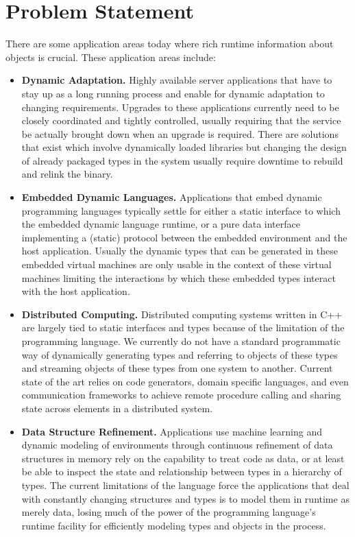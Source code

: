 \section{Problem Statement}

There are some application areas today where rich runtime information about
objects is crucial.  These application areas include:

\begin{itemize}

  \item \textbf{Dynamic Adaptation.} Highly available server applications that
  have to stay up as a long running process and enable for dynamic adaptation
  to changing requirements. Upgrades to these applications currently need to
  be closely coordinated and tightly controlled, usually requiring that the
  service be actually brought down when an upgrade is required. There are
  solutions that exist which involve dynamically loaded libraries but changing
  the design of already packaged types in the system usually require downtime
  to rebuild and relink the binary.

  \item \textbf{Embedded Dynamic Languages.} Applications that embed dynamic
  programming languages typically settle for either a static interface to
  which the embedded dynamic language runtime, or a pure data interface
  implementing a (static) protocol between the embedded environment and the
  host application. Usually the dynamic types that can be generated in these
  embedded virtual machines are only usable in the context of these virtual
  machines limiting the interactions by which these embedded types interact
  with the host application.

  \item \textbf{Distributed Computing.} Distributed computing systems written
  in C++ are largely tied to static interfaces and types because of the
  limitation of the programming language. We currently do not have a standard
  programmatic way of dynamically generating types and referring to objects of
  these types and streaming objects of these types from one system to another.
  Current state of the art relies on code generators, domain specific
  languages, and even communication frameworks to achieve remote procedure
  calling and sharing state across elements in a distributed system.

  \item \textbf{Data Structure Refinement.} Applications use machine learning
  and dynamic modeling of environments through continuous refinement of data
  structures in memory rely on the capability to treat code as data, or at
  least be able to inspect the state and relationship between types in a
  hierarchy of types. The current limitations of the language force the
  applications that deal with constantly changing structures and types is to
  model them in runtime as merely data, losing much of the power of the
  programming language’s runtime facility for efficiently modeling types and
  objects in the process.


\end{itemize}
